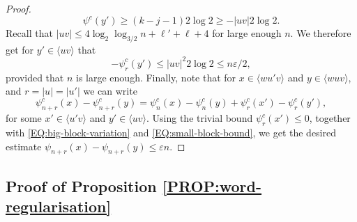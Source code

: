 \documentclass[11pt,reqno]{amsart}
\theoremstyle{plain}
\theoremstyle{definition}
\begin{document}
\begin{proof}
\[
\psi^c(y') \geqslant (k-j-1) 2\log 2 \geqslant - |uv| 2 \log 2.
\]
Recall that $|uv| \leqslant 4 \log_2 \log_{3/2} n + \ell' + \ell + 4$
for large enough $n$. We therefore get for $y'\in \langle uv \rangle$ that
\begin{equation}
\label{EQ:small-block-bound}
- \psi^c_r(y') \leqslant |uv|^2 2 \log 2 \leqslant n \varepsilon/2,
\end{equation}
provided that $n$ is large enough. 
Finally, note that for $x \in \langle wu'v \rangle$ and $y \in \langle wuv \rangle$, and $r=|u| = |u'|$ we can write
\[
\psi^c_{n+r}(x) - \psi^c_{n+r}(y)
= \psi^c_n(x) - \psi^c_n(y) + \psi^c_r(x') - \psi^c_r(y'),
\]
for some $x' \in \langle u'v \rangle$ and $y' \in \langle uv \rangle$. Using the trivial bound $\psi^c_r(x') \leqslant 0$, together with \eqref{EQ:big-block-variation} and \eqref{EQ:small-block-bound}, we get the desired estimate $\psi_{n+r}(x) - \psi_{n+r}(y) \leqslant \varepsilon n$.
\end{proof}





\subsection{Proof of Proposition \ref{PROP:word-regularisation}}\label{subsec: proof word regularisation}
\end{document}
